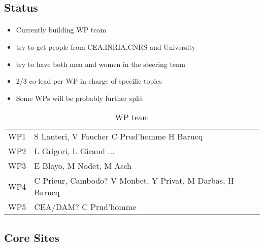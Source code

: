 \subsection{Status}

\begin{frame}[fragile=singleslide]{\insertsectionhead}
  \framesubtitle{\insertsubsectionhead}
  \begin{itemize}
      \item Currently building WP team
      \item try to get people from CEA,INRIA,CNRS and University
      \item try to have both men and women in the steering team
      \item 2/3 co-lead per WP in charge of specific topics
      \item Some WPs will be probably further split
  \end{itemize}
  \begin{table}[]
      \centering
      \begin{tabular}{c|l}
          WP1 &  S Lanteri, V Faucher C Prud'homme H Barucq\\
          WP2&  L Grigori, L Giraud ...\\
          WP3& E Blayo, M Nodet, M Asch \\
          WP4& C Prieur, Cambodo? V Monbet, Y Privat, M Darbas, H Barucq \\
          WP5 & CEA/DAM? C Prud'homme
      \end{tabular}
      \caption{WP team}
      \label{tab:my_label}
  \end{table}

\end{frame}



\subsection{Core Sites}


